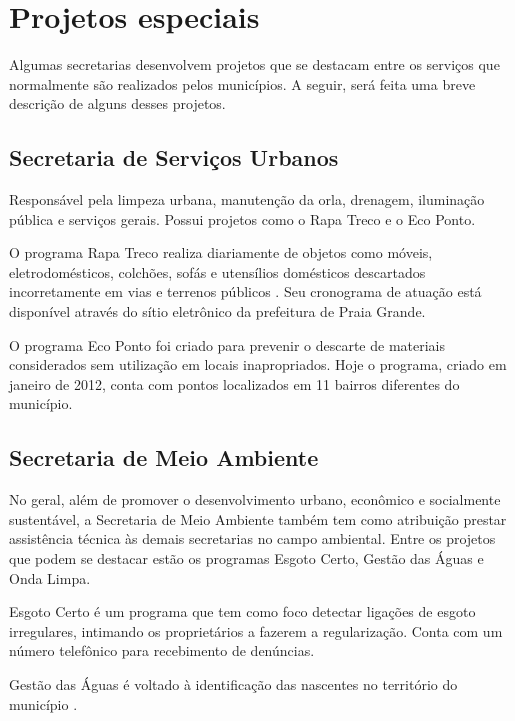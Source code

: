 	
	\section{Projetos especiais}
	
	Algumas secretarias desenvolvem projetos que se destacam entre os serviços que normalmente são realizados pelos municípios. A seguir, será feita uma breve descrição de alguns desses projetos.
	
	\subsection{Secretaria de Serviços Urbanos}
	
	Responsável pela limpeza urbana, manutenção da orla, drenagem, iluminação pública e serviços gerais. Possui projetos como o Rapa Treco e o Eco Ponto.
	
	O programa Rapa Treco realiza diariamente de objetos como móveis, eletrodomésticos, colchões, sofás e utensílios domésticos descartados incorretamente em vias e terrenos públicos \cite{deMarco2015a}. Seu cronograma de atuação está disponível através do sítio eletrônico da prefeitura de Praia Grande.
	
	O programa Eco Ponto foi criado para prevenir o descarte de materiais considerados sem utilização em locais inapropriados. Hoje o programa, criado em janeiro de 2012, conta com pontos localizados em 11 bairros diferentes do município. \cite{pmpg2017d}
	
	\subsection{Secretaria de Meio Ambiente}
	
	No geral, além de promover o desenvolvimento urbano, econômico e socialmente sustentável, a Secretaria de Meio Ambiente também tem como atribuição prestar assistência técnica às demais secretarias no campo ambiental. Entre os projetos que podem se destacar estão os programas Esgoto Certo, Gestão das Águas e Onda Limpa.
	
	Esgoto Certo é um programa que tem como foco detectar ligações de esgoto irregulares, intimando os proprietários a fazerem a regularização. Conta com um número telefônico para recebimento de denúncias. \cite{pmpg2017e}
	
	Gestão das Águas é voltado à identificação das nascentes no território do município \cite{pmpg2017f}.
	
